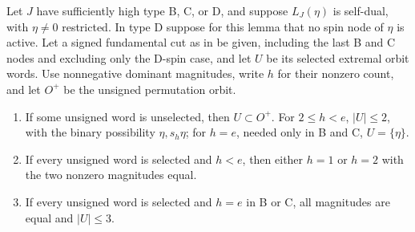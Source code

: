 \begin{lemma}\label{w:signed-cuts}
Let $J$ have sufficiently high type B, C, or D, and suppose $L_J(\eta)$ is self-dual, with $\eta\ne0$ restricted. In type D suppose for this lemma that no spin node of $\eta$ is active. Let a signed fundamental cut as in  be given, including the last B and C nodes and excluding only the D-spin case, and let $U$ be its selected extremal orbit words. Use nonnegative dominant magnitudes, write $h$ for their nonzero count, and let $O^+$ be the unsigned permutation orbit.
\begin{enumerate}
\item If some unsigned word is unselected, then $U\subset O^+$. For $2\le h<e$, $|U|\le2$, with the binary possibility $\eta,s_h\eta$; for $h=e$, needed only in B and C, $U=\{\eta\}$.
\item If every unsigned word is selected and $h<e$, then either $h=1$ or $h=2$ with the two nonzero magnitudes equal.
\item If every unsigned word is selected and $h=e$ in B or C, all magnitudes are equal and $|U|\le3$.
\end{enumerate}
\end{lemma}
